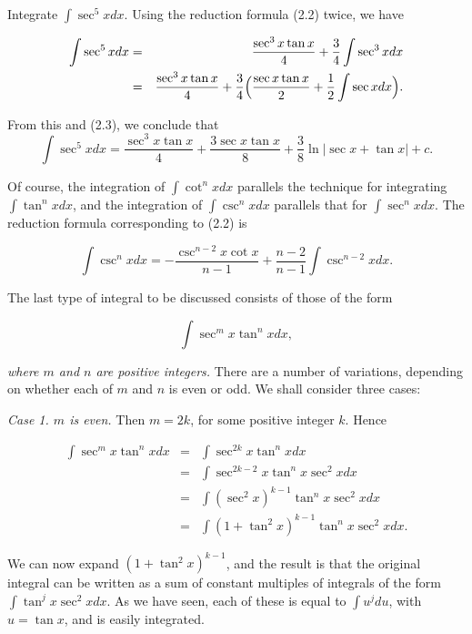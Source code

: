 \begin{example} 
Integrate $\int \sec^{5} x dx$. Using the reduction formula (2.2) twice, we have

\begin{eqnarray*}
\int \sec^{5}x dx &=& \frac{\sec^{3} x \tan x}{4} + \frac{3}{4} \int \sec^{3}x dx\\
&=& \frac{\sec^{3}x \tan x}{4} + \frac{3}{4} \Bigl( \frac{\sec x \tan x}{2} + \frac{1}{2} \int \sec x dx \Bigr). 
\end{eqnarray*}

\noindent From this and (2.3), we conclude that
$$
\int \sec^{5} x dx = \frac{\sec^{3}x \tan x}{4} + \frac{ 3 \sec x \tan x}{8}  + \frac{ 3}{8}
\ln | \sec x + \tan x | + c. 
$$
\end{example}

Of course, the integration of $\int \cot^{n}x dx$ parallels the technique for integrating 
$\int \tan^{n}x dx$, and the integration of $\int \csc^{n} x dx$ parallels that for $\int \sec^{n}x dx$. 
The reduction formula corresponding to (2.2) is


\begin{theorem} %
$$
\int \csc^{n} x dx = -\frac{\csc^{n - 2} x \cot x}{n - 1} + \frac{n - 2}{n - 1} \int \csc^{n - 2} x dx .
$$
\end{theorem}

The last type of integral to be discussed consists of those of the form

\begin{equation}
\int \sec^{m}x \tan^{n}x dx,  
\label{eq7.2.6}
\end{equation}

\noindent \textit{where $m$ and $n$ are positive integers.} There are a number of variations, depending on whether each of $m$ and $n$ is even or odd. We shall consider 
three cases:

\textit{Case 1. $m$ is even.} Then $m = 2k$, for some positive integer $k$. Hence

\begin{eqnarray*}
\int \sec^{m}x \tan^{n}x dx &=& \int \sec^{2k}x \tan^{n}x dx \\
&=& \int \sec^{2k-2}x \tan^{n}x \sec^{2}x dx\\
&=& \int (\sec^{2}x)^{k-1} \tan^{n}x \sec^{2} xdx\\
&=& \int (1 + \tan^{2}x)^{k-1} \tan^{n}x \sec^{2}x dx.
\end{eqnarray*}

\noindent We can now expand $(1 + \tan^{2}x)^{k-1}$, and the result is that the original integral can be written as a sum of constant multiples of integrals of the form $\int \tan^{j}x \sec^{2}x dx$. As we have seen, each of these is equal to $\int u^{j}du$, with $u = \tan x$, and is easily integrated.

